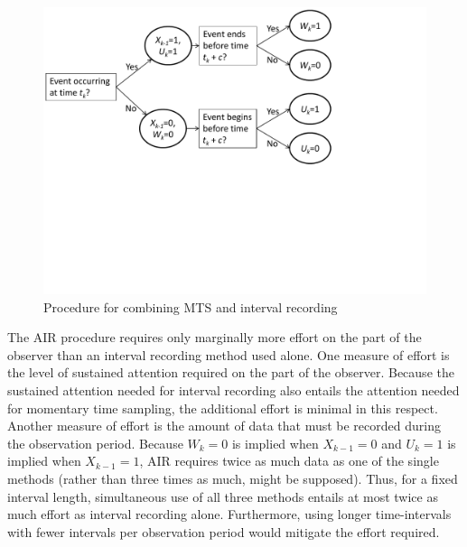 \documentclass[man, noextraspace, floatsintext]{apa6}\usepackage[]{graphicx}\usepackage[]{color}
\begin{document}
\begin{figure}[hbtp]
\centering
\includegraphics[clip=true, trim= 0 240 150 00, width=0.8\linewidth]{AIR_flowchart.pdf}
\caption{Procedure for combining MTS and interval recording}
\label{fig:questions}
\end{figure}  

The AIR procedure requires only marginally more effort on the part of the observer than an interval recording method used alone. 
One measure of effort is the level of sustained attention required on the part of the observer. Because the sustained attention needed for interval recording also entails the attention needed for momentary time sampling, the additional effort is minimal in this respect.
Another measure of effort is the amount of data that must be recorded during the observation period. Because $W_k = 0$ is implied when $X_{k-1} = 0$ and $U_k = 1$ is implied when $X_{k-1} = 1$, AIR requires twice as much data as one of the single methods (rather than three times as much, might be supposed). 
Thus, for a fixed interval length, simultaneous use of all three methods entails at most twice as much effort as interval recording alone. 
Furthermore, using longer time-intervals with fewer intervals per observation period would mitigate the effort required.
\end{document}
